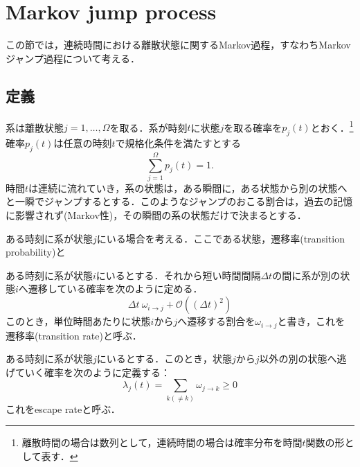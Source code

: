 \section{Markov jump process}
この節では，連続時間における離散状態に関するMarkov過程，すなわちMarkovジャンプ過程について考える．


\subsection{定義}
系は離散状態$j=1,\ldots,\Omega$を取る．系が時刻$t$に状態$j$を取る確率を$p_j(t)$とおく．\footnote{
離散時間の場合は数列として，連続時間の場合は確率分布を時間$t$関数の形として表す．
}
確率$p_j(t)$は任意の時刻$t$で規格化条件を満たすとする
\begin{equation}
    \sum_{j=1}^{\Omega} p_j(t) = 1.
\end{equation}
時間$t$は連続に流れていき，系の状態は，ある瞬間に，ある状態から別の状態へと一瞬でジャンプするとする．このようなジャンプのおこる割合は，過去の記憶に影響されず(Markov性)，その瞬間の系の状態だけで決まるとする．

ある時刻に系が状態$j$にいる場合を考える．ここである状態，遷移率(transition probability)と
\begin{kotak}
	\begin{definition}
	ある時刻に系が状態$i$にいるとする．それから短い時間間隔$\Delta t$の間に系が別の状態$i$へ遷移している確率を次のように定める．
	\begin{equation}
	    \Delta t\ \omega_{i\to j} + \mathcal{O}((\Delta t)^2)
	\end{equation}
	このとき，単位時間あたりに状態$i$から$j$へ遷移する割合を$\omega_{i\to j}$と書き，これを遷移率(transition rate)と呼ぶ．
	\end{definition}
\end{kotak}
\begin{kotak}
	\begin{definition}
	ある時刻に系が状態$j$にいるとする．このとき，状態$j$から$j$以外の別の状態へ逃げていく確率を次のように定義する：
	\begin{equation}
	    \lambda_j(t) = \sum_{k(\neq k)}\omega_{j\to k} \geq 0
	\end{equation}
	これをescape rateと呼ぶ．
	\end{definition}
\end{kotak}

